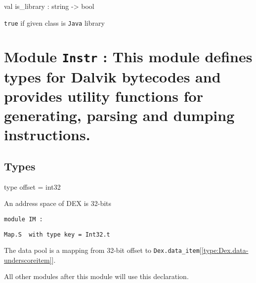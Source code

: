 \documentclass[11pt]{article}
\begin{document}
\label{val:Java.is-underscorelibrary}\begin{ocamldoccode}
val is_library : string -> bool
\end{ocamldoccode}
\begin{ocamldocdescription}
{\tt{true}} if given class is {\tt{Java}} library


\end{ocamldocdescription}


\section{Module {\tt{Instr}} : This module defines types for Dalvik bytecodes and provides utility
 functions for generating, parsing and dumping instructions.}
\label{module:Instr}




\ocamldocvspace{0.5cm}



\subsection{Types}




\label{type:Instr.offset}\begin{ocamldoccode}
type offset = int32 
\end{ocamldoccode}
\begin{ocamldocdescription}
An address space of DEX is 32-bits


\end{ocamldocdescription}




\begin{ocamldoccode}
{\tt{module }}{\tt{IM}}{\tt{ : }}\end{ocamldoccode}
\label{module:Instr.IM}

{\tt{Map.S}}{\tt{ }}{\tt{ with type key = Int32.t}}

\begin{ocamldocdescription}
The data pool is a mapping from 32-bit offset to {\tt{Dex.data\_item}}[\ref{type:Dex.data-underscoreitem}].

All other modules after this module will use this declaration.


\end{ocamldocdescription}
\end{document}
